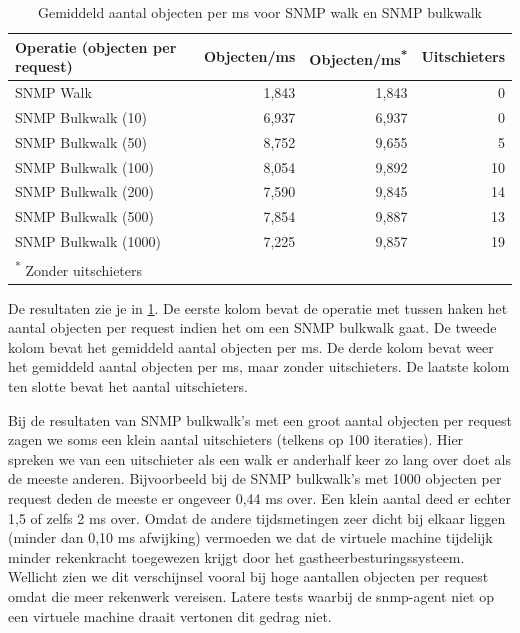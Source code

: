 \begin{table}[h]
\centering
\begin{tabular}{@{}lrrr@{}}
\toprule
Operatie (objecten per request) & Objecten/ms & Objecten/ms\textsuperscript{*} & Uitschieters \\ \midrule
SNMP Walk                       & 1,843       & 1,843           & 0            \\
SNMP Bulkwalk (10)              & 6,937       & 6,937           & 0            \\
SNMP Bulkwalk (50)              & 8,752       & 9,655           & 5            \\
SNMP Bulkwalk (100)             & 8,054       & 9,892           & 10           \\
SNMP Bulkwalk (200)             & 7,590       & 9,845           & 14           \\
SNMP Bulkwalk (500)             & 7,854       & 9,887           & 13           \\
SNMP Bulkwalk (1000)            & 7,225       & 9,857           & 19           \\ \midrule[.5pt]
\multicolumn{4}{l}{\textsuperscript{*} \footnotesize{Zonder uitschieters}}
\end{tabular}
\caption{Gemiddeld aantal objecten per ms voor SNMP walk en SNMP bulkwalk}
\label{tabel-bulkrequests}
\end{table}


De resultaten zie je in \cref{tabel-bulkrequests}.
De eerste kolom bevat de operatie met tussen haken het aantal objecten per request indien het om een SNMP bulkwalk gaat.
De tweede kolom bevat het gemiddeld aantal objecten per ms.
De derde kolom bevat weer het gemiddeld aantal objecten per ms, maar zonder uitschieters.
De laatste kolom ten slotte bevat het aantal uitschieters.

Bij de resultaten van SNMP bulkwalk's met een groot aantal objecten per request zagen we soms een klein aantal uitschieters (telkens op 100 iteraties).
Hier spreken we van een uitschieter als een walk er anderhalf keer zo lang over doet als de meeste anderen.
Bijvoorbeeld bij de SNMP bulkwalk's met 1000 objecten per request deden de meeste er ongeveer 0,44 ms over.
Een klein aantal deed er echter 1,5 of zelfs 2 ms over.
Omdat de andere tijdsmetingen zeer dicht bij elkaar liggen (minder dan 0,10 ms afwijking) vermoeden we
dat de virtuele machine tijdelijk minder rekenkracht toegewezen krijgt door het gastheerbesturingssysteem.
Wellicht zien we dit verschijnsel vooral bij hoge aantallen objecten per request omdat die meer rekenwerk vereisen.
Latere tests waarbij de \gls{snmp-agent} niet op een virtuele machine draait vertonen dit gedrag niet.

